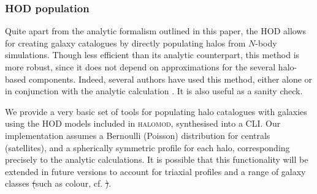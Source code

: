 \documentclass[5p,aas_macros]{elsarticle}
\providecommand{\DIFdeltex}[1]{{\protect\color{red}\sout{#1}}}                      %
\providecommand{\DIFdelbegin}{} %
\providecommand{\DIFdelend}{} %
\providecommand{\DIFdel}[1]{\texorpdfstring{\DIFdeltex{#1}}{}} %
\begin{document}
\subsubsection{HOD population}
\label{sec:halomod:extra:pophod}
Quite apart from the analytic formalism outlined in this paper, the HOD allows for creating galaxy catalogues by directly populating halos from $N$-body simulations. Though less efficient than its analytic counterpart, this method is more robust, since it does not depend on approximations for the several halo-based components. Indeed, several authors have used this method, either alone or in conjunction with the analytic calculation \citep{Skibba2015,Zheng2015}. It is also useful as a sanity check.

We provide a very basic set of tools for populating halo catalogues with galaxies using the HOD models included in \textsc{halomod}, synthesised into a CLI. Our implementation assumes a Bernoulli (Poisson) distribution for centrals (satellites), and a spherically symmetric profile for each halo, corresponding precisely to the analytic calculations. It is possible that this functionality will be extended in future versions to account for triaxial profiles \citep{Jing2002} and a range of galaxy classes \DIFdelbegin \DIFdel{(}\DIFdelend such as colour, cf. \citet{Skibba2009}\DIFdelbegin \DIFdel{)}\DIFdelend . 



\end{document}
